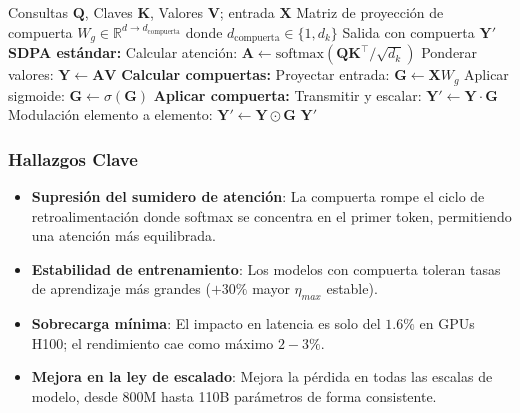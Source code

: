 \begin{algorithm}[H]
\caption{Atención Softmax con Compuerta (Post-SDPA)}
\begin{algorithmic}[1]
\Require Consultas $\mathbf{Q}$, Claves $\mathbf{K}$, Valores $\mathbf{V}$; entrada $\mathbf{X}$
\Require Matriz de proyección de compuerta $W_g \in \mathbb{R}^{d \to d_{\text{compuerta}}}$ donde $d_{\text{compuerta}} \in \{1, d_k\}$
\Ensure Salida con compuerta $\mathbf{Y}'$
\State \textbf{SDPA estándar:}
\State Calcular atención: $\mathbf{A} \gets \text{softmax}(\mathbf{Q}\mathbf{K}^\top / \sqrt{d_k})$ 
\State Ponderar valores: $\mathbf{Y} \gets \mathbf{A} \mathbf{V}$
\State \textbf{Calcular compuertas:}
\State Proyectar entrada: $\mathbf{G} \gets \mathbf{X} W_g$  
\State Aplicar sigmoide: $\mathbf{G} \gets \sigma(\mathbf{G})$ 
\State \textbf{Aplicar compuerta:}
    \State Transmitir y escalar: $\mathbf{Y}' \gets \mathbf{Y} \cdot \mathbf{G}$ 
\Else
    \State Modulación elemento a elemento: $\mathbf{Y}' \gets \mathbf{Y} \odot \mathbf{G}$ 
\EndIf
\Return $\mathbf{Y}'$
\end{algorithmic}
\end{algorithm}

\subsubsection{Hallazgos Clave}

\begin{itemize}[leftmargin=*]
    \item \textbf{Supresión del sumidero de atención}: La compuerta rompe el ciclo de retroalimentación donde softmax se concentra en el primer token, permitiendo una atención más equilibrada.
    \item \textbf{Estabilidad de entrenamiento}: Los modelos con compuerta toleran tasas de aprendizaje más grandes ($+30\%$ mayor $\eta_{max}$ estable).
    \item \textbf{Sobrecarga mínima}: El impacto en latencia es solo del $1.6\%$ en GPUs H100; el rendimiento cae como máximo $2-3\%$.
    \item \textbf{Mejora en la ley de escalado}: Mejora la pérdida en todas las escalas de modelo, desde 800M hasta 110B parámetros de forma consistente.
\end{itemize}

